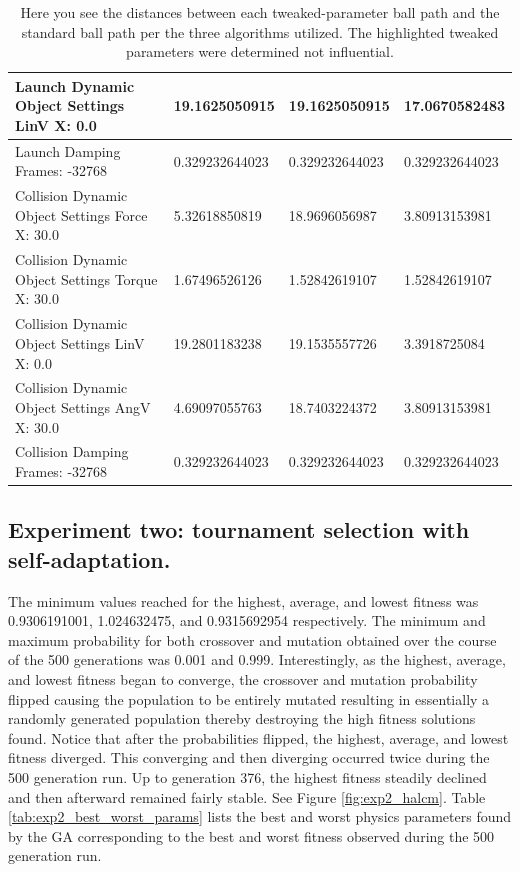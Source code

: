 \begin{table}[htbp]
\begin{tabular}{ | l || l | l | l | }
Launch Dynamic Object Settings LinV X: 0.0 & 19.1625050915  & 19.1625050915  & 17.0670582483 \\ \hline
\rowcolor{cyan}
Launch Damping Frames: -32768 & 0.329232644023 & 0.329232644023  & 0.329232644023 \\ \hline
Collision Dynamic Object Settings Force X: 30.0 & 5.32618850819  & 18.9696056987  & 3.80913153981 \\ \hline
Collision Dynamic Object Settings Torque X: 30.0 & 1.67496526126  & 1.52842619107  & 1.52842619107 \\ \hline
Collision Dynamic Object Settings LinV X: 0.0 & 19.2801183238  & 19.1535557726  & 3.3918725084 \\ \hline
Collision Dynamic Object Settings AngV X: 30.0 & 4.69097055763 & 18.7403224372 & 3.80913153981 \\ \hline
\rowcolor{cyan}
Collision Damping Frames: -32768 & 0.329232644023 & 0.329232644023 & 0.329232644023 \\ \hline
\end{tabular}
\caption[Physics Engine Parameter Influences]{Here you see the distances between each tweaked-parameter ball path and the standard ball path per the three algorithms utilized. The highlighted tweaked parameters were determined not influential.}
\label{tab:distances}
\end{table}

\newpage

\subsection[Experiment Two]{Experiment two: tournament selection with self-adaptation.}

The minimum values reached for the highest, average, and lowest fitness was 0.9306191001, 1.024632475, and 0.9315692954 respectively. The minimum and maximum probability for both crossover and mutation obtained over the course of the 500 generations was 0.001 and 0.999. Interestingly, as the highest, average, and lowest fitness began to converge, the crossover and mutation probability flipped causing the population to be entirely mutated resulting in essentially a randomly generated population thereby destroying the high fitness solutions found. Notice that after the probabilities flipped, the highest, average, and lowest fitness diverged. This converging and then diverging occurred twice during the 500 generation run. Up to generation 376, the highest fitness steadily declined and then afterward remained fairly stable. See Figure \ref{fig:exp2_halcm}. Table \ref{tab:exp2_best_worst_params} lists the best and worst physics parameters found by the GA corresponding to the best and worst fitness observed during the 500 generation run.


